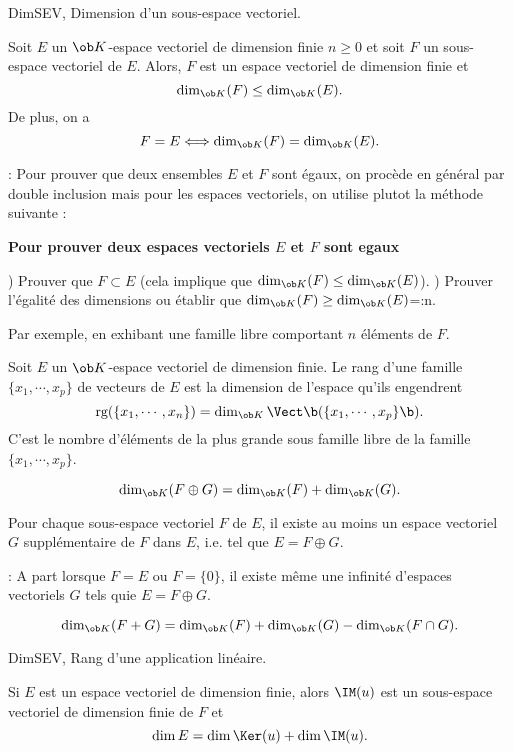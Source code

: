 \Subsection DimSEV, Dimension d'un sous-espace vectoriel. 
\bigskip

\Propriete []  Soit $E$ un $\ob K$-espace vectoriel de dimension finie $n\ge0$ et soit $F$ un sous-espace vectoriel de $E$. 
Alors, $F$ est un espace vectoriel de dimension finie et $$
{\dim_{\ob K}(F)\le\dim_{\ob K}(E)}. 
$$
De plus, on a 
$$
{F=E\Longleftrightarrow \dim_{\ob K}(F)=\dim_{\ob K}(E)}.
$$


\Remarque : Pour prouver que deux ensembles $E$ et $F$ sont égaux, on procède en général par double inclusion mais pour les espaces vectoriels, on utilise plutot la méthode suivante : 
\bigskip


\centerline{\bf Pour prouver deux espaces vectoriels $E$ et $F$ sont egaux}
\medskip{}) Prouver que $F\subset E$ (cela implique que $\dim_{\ob K}(F)\le \dim_{\ob K}(E)$).
\medskip
{}) Prouver l'égalité des dimensions ou établir que $\dim_{\ob K}(F)\ge \dim_{\ob K}(E)$=:n.
 
Par exemple, en exhibant une famille libre comportant $n$ éléments de $F$.
\bigskip

\Definition []  Soit $E$ un $\ob K$-espace vectoriel de dimension finie. Le rang d'une famille $\{x_1,\cdots, x_p\}$ de vecteurs de $E$ est la dimension de l'espace qu'ils engendrent 
$$
{\mbox{rg}(\{x_1,\cdots,x_n\})=\dim_{\ob K}\Vect\b(\{x_1,\cdots,x_p\}\b)}.
$$ 
C'est le nombre d'éléments de la plus grande sous famille libre de la famille $\{x_1,\cdots,x_p\}$. 
\bigskip


$$
\dim_{\ob K}(F\oplus G)=\dim_{\ob K}(F)+\dim_{\ob K}(G).
$$

Pour chaque sous-espace vectoriel $F$ de $E$, il existe au moins un espace vectoriel $G$ supplémentaire de $F$ dans $E$, i.e. tel que $E=F\oplus G$. 

\Remarque : A part lorsque $F=E$ ou $F=\{0\}$, il existe même une infinité d'espaces vectoriels $G$ tels quie $E=F\oplus G$. 
\bigskip

$$
\dim_{\ob K}(F+G)=\dim_{\ob K}(F)+\dim_{\ob K}(G)-\dim_{\ob K}(F\cap G).
$$


\Subsection DimSEV, Rang d'une application linéaire. 
\bigskip

\Theoreme [Title=Théorème du rang;$u:E\to F$ application linéaire]
Si $E$ est un espace vectoriel de dimension finie, alors $\IM(u)$ est un 
sous-espace vectoriel de dimension finie de $F$ et  
$$
\dim E=\dim\Ker(u)+\dim\IM(u).
$$ 


